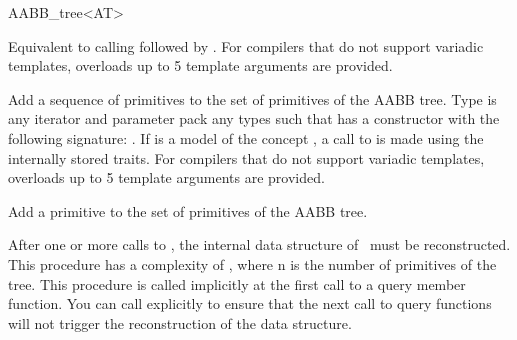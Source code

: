 \begin{ccRefClass}{AABB_tree<AT>}
\ccOperations

{ Equivalent to calling  followed by .
  For compilers that do not support variadic templates, overloads up to 5 template arguments are provided.}



   {Add a sequence of primitives to the set of primitives of the AABB
   tree. Type  is any iterator and parameter pack  any types such that 
   has a constructor with the following signature: . If  is a model of
   the concept , a call to  is made using the internally stored traits.
   For compilers that do not support variadic templates, overloads up to 5 template arguments are provided.}

   {Add a primitive to the set of primitives of the AABB tree.}
 
\begin{ccAdvanced}
   {After one or more calls to , the internal data structure
   of \ccRefName\ must be reconstructed.  This procedure has a complexity of
   , where n is the number of primitives of the tree.  This
   procedure is called implicitly at the first call to a query member
   function.  You can call  explicitly to ensure that the
   next call to query functions will not trigger the reconstruction of the
   data structure.}
\end{ccAdvanced}


\ccGlue
{}
\ccGlue
{}
\ccGlue
{}


\end{ccRefClass}
